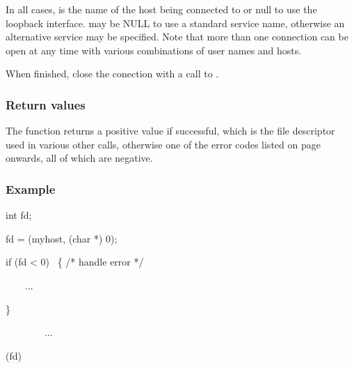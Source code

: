 In all cases,  is the name of the host being connected to or null to use the loopback interface.
 may be NULL to use a standard service name, otherwise an alternative service may be specified.
Note that more than one connection can be open at any time with various combinations of user names and hosts.

When finished, close the conection with a call to \funcXBclose.

\subsubsection{Return values}
The function returns a positive value if successful, which is the file
descriptor used in various other calls, otherwise one of the error
codes listed on page \pageref{errorcodes} onwards, all of which are
negative.

\subsubsection{Example}

\begin{expara}

int fd;

fd = \funcnameXBopen{}({\textquotedbl}myhost{\textquotedbl}, (char *) 0);

if (fd {\textless} 0) \ \{ /* handle error */

\ \ \ \ ...

\}

\ \ \ \ \ \ \ \ ...

\funcnameXBclose{}(fd)

\end{expara}

